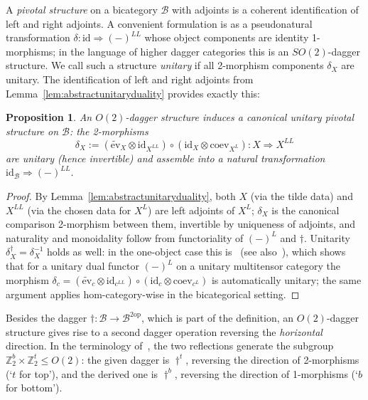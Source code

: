 \documentclass[11pt]{article}
\newtheorem{proposition}[theorem]{Proposition}
\theoremstyle{definition}
\newcommand{\cB}{\mathcal{B}}
\newcommand{\bZ}{\mathbb{Z}}
\newcommand{\op}{\mathrm{op}}
\newcommand{\SO}{SO}
\newcommand{\Or}{O} %
\newcommand{\dg}{\dagger}
\begin{document}
A \emph{pivotal structure} on a bicategory $\cB$ with adjoints is a coherent identification of left and right adjoints. A convenient formulation is as a pseudonatural transformation $\delta \colon \mathrm{id} \Rightarrow (-)^{LL}$ whose object components are identity 1-morphisms; in the language of higher dagger categories this is an $\SO(2)$-dagger structure. We call such a structure \emph{unitary} if all 2-morphism components $\delta_X$ are unitary. The identification of left and right adjoints from Lemma~\ref{lem:abstractunitaryduality} provides exactly this:
\begin{proposition}
\label{prop:abstractpivotal}
An $\Or(2)$-dagger structure induces a canonical unitary pivotal structure on $\cB$: the 2-morphisms
\begin{equation}
  \delta_X := (\widetilde{\mathrm{ev}}_X \otimes \mathrm{id}_{X^{LL}}) \circ (\mathrm{id}_X \otimes \mathrm{coev}_{X^L}) \colon X \Longrightarrow X^{LL}
\end{equation}
are unitary (hence invertible) and assemble into a natural transformation $\mathrm{id}_\cB \Rightarrow (-)^{LL}$.
\end{proposition}

\begin{proof}
By Lemma~\ref{lem:abstractunitaryduality}, both $X$ (via the tilde data) and $X^{LL}$ (via the chosen data for $X^L$) are left adjoints of $X^L$; $\delta_X$ is the canonical comparison 2-morphism between them, invertible by uniqueness of adjoints, and naturality and monoidality follow from functoriality of $(-)^L$ and $\dg$. Unitarity $\delta_X^\dg = \delta_X^{-1}$ holds as well: in the one-object case this is~\cite[Prop.~3.9, Cor.~3.10]{Pen20} (see also~\cite[Thm.~2.8.1]{Ste23}), which shows that for a unitary dual functor $(-)^L$ on a unitary multitensor category the morphism $\delta_c = (\widetilde{\mathrm{ev}}_c \otimes \mathrm{id}_{c^{LL}}) \circ (\mathrm{id}_c \otimes \mathrm{coev}_{c^L})$ is automatically unitary; the same argument applies hom-category-wise in the bicategorical setting.
\end{proof}

Besides the dagger $\dg \colon \cB \to \cB^{2\op}$, which is part of the definition, an $\Or(2)$-dagger structure gives rise to a second dagger operation reversing the \emph{horizontal} direction. In the terminology of~\cite{FHJF24,CL25,Mue25,FMPS26}, the two reflections generate the subgroup $\bZ_2^b \times \bZ_2^t \leq \Or(2)$: the given dagger is $\dg^t$, reversing the direction of 2-morphisms (`$t$ for top'), and the derived one is $\dg^b$, reversing the direction of 1-morphisms (`$b$ for bottom').
\end{document}
